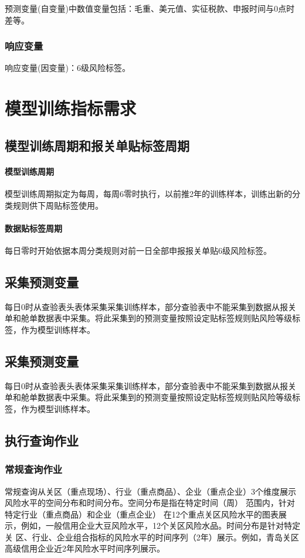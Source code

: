 \documentclass[a4paper]{tufte-book}%
\theoremstyle{definition}
\theoremstyle{definition}
\begin{document}
预测变量(自变量)中数值变量包括：毛重、美元值、实征税款、申报时间与0点时差等。
\subsubsection{响应变量}
响应变量(因变量)：6级风险标签。
\section{模型训练指标需求}
\subsection{模型训练周期和报关单贴标签周期}
\paragraph{模型训练周期}
模型训练周期拟定为每周，每周6零时执行，以前推2年的训练样本，训练出新的分类规则供下周贴标签使用。
\paragraph{数据贴标签周期}
每日零时开始依据本周分类规则对前一日全部申报报关单贴6级风险标签。

\subsection{采集预测变量}
每日0时从查验表头表体采集采集训练样本，部分查验表中不能采集到数据从报关单和舱单数据表中采集。将此采集到的预测变量按照设定贴标签规则贴风险等级标签，作为模型训练样本。

\subsection{采集预测变量}
每日0时从查验表头表体采集采集训练样本，部分查验表中不能采集到数据从报关单和舱单数据表中采集。将此采集到的预测变量按照设定贴标签规则贴风险等级标签，作为模型训练样本。


\subsection{执行查询作业}

\subsubsection{常规查询作业}常规查询从关区（重点现场）、行业（重点商品）、企业（重点企业）3个维度展示风险水平的空间分布和时间分布。空间分布是指在特定时间（周）
范围内，针对特定行业（重点商品）和企业（重点企业）
在12个重点关区风险水平的图表展示，例如，一般信用企业大豆风险水平，12个关区风险水品。时间分布是针对特定关
区、行业、企业组合指标的风险水平的时间序列（2年）展示。例如，青岛关区高级信用企业近2年风险水平时间序列展示。
\end{document}
